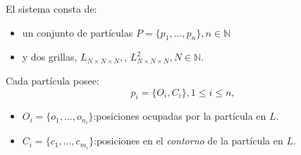 \documentclass[spanish,unknownkeysallowed]{beamer}
\begin{document}
\begin{frame}
El sistema consta de:
\begin{itemize}
\item un conjunto de partículas $P = \{p_{1}, ... , p_{n}\}, n  \in \mathbb{N}$
\item y dos grillas, $L_{N\times N \times N},$, $L^{2}_{N\times N \times N}, N \in \mathbb{N}.$
\end{itemize}


Cada partícula posee:
\begin{equation*}
  p_{i} = \{O_{i}, C_{i}\}, 1 \le i \le n,
\end{equation*}

\begin{itemize}
\item $O_{i} = \{o_{1}, ... , o_{n_{i}}\}$:posiciones ocupadas por la part\'icula en $L$.

\item $C_{i} = \{c_{1}, ... , c_{m_{i}}\}$:posiciones en el {\em contorno} de la part\'icula en $L$.
\end{itemize}

\end{frame}


\end{document}
